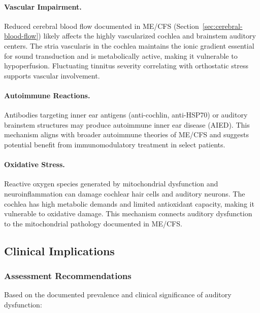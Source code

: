\paragraph{Vascular Impairment.}
Reduced cerebral blood flow documented in ME/CFS (Section~\ref{sec:cerebral-blood-flow}) likely affects the highly vascularized cochlea and brainstem auditory centers. The stria vascularis in the cochlea maintains the ionic gradient essential for sound transduction and is metabolically active, making it vulnerable to hypoperfusion. Fluctuating tinnitus severity correlating with orthostatic stress supports vascular involvement.

\paragraph{Autoimmune Reactions.}
Antibodies targeting inner ear antigens (anti-cochlin, anti-HSP70) or auditory brainstem structures may produce autoimmune inner ear disease (AIED). This mechanism aligns with broader autoimmune theories of ME/CFS and suggests potential benefit from immunomodulatory treatment in select patients.

\paragraph{Oxidative Stress.}
Reactive oxygen species generated by mitochondrial dysfunction and neuroinflammation can damage cochlear hair cells and auditory neurons. The cochlea has high metabolic demands and limited antioxidant capacity, making it vulnerable to oxidative damage. This mechanism connects auditory dysfunction to the mitochondrial pathology documented in ME/CFS.

\subsection{Clinical Implications}

\subsubsection{Assessment Recommendations}

Based on the documented prevalence and clinical significance of auditory dysfunction:

